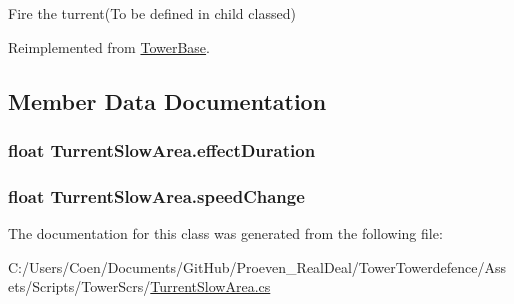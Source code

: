 Fire the turrent(\+To be defined in child classed) 



Reimplemented from \hyperlink{class_tower_base_a15cc4c8b977e8c43269c64a8013d6c0a}{Tower\+Base}.



\subsection{Member Data Documentation}
\subsubsection[{\texorpdfstring{effect\+Duration}{effectDuration}}]{\setlength{\rightskip}{0pt plus 5cm}float Turrent\+Slow\+Area.\+effect\+Duration}\hypertarget{class_turrent_slow_area_a3bd4470ef1ca73064b3a8a67bb1d7f49}{}\label{class_turrent_slow_area_a3bd4470ef1ca73064b3a8a67bb1d7f49}
\subsubsection[{\texorpdfstring{speed\+Change}{speedChange}}]{\setlength{\rightskip}{0pt plus 5cm}float Turrent\+Slow\+Area.\+speed\+Change}\hypertarget{class_turrent_slow_area_aef2fb80bc18a33aa4cd196d41ce37a61}{}\label{class_turrent_slow_area_aef2fb80bc18a33aa4cd196d41ce37a61}


The documentation for this class was generated from the following file\+:\begin{DoxyCompactItemize}
\item 
C\+:/\+Users/\+Coen/\+Documents/\+Git\+Hub/\+Proeven\+\_\+\+Real\+Deal/\+Tower\+Towerdefence/\+Assets/\+Scripts/\+Tower\+Scr\textquotesingle{}s/\hyperlink{_turrent_slow_area_8cs}{Turrent\+Slow\+Area.\+cs}\end{DoxyCompactItemize}
